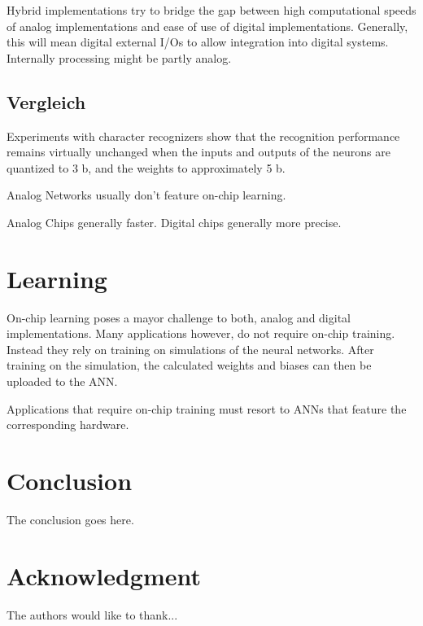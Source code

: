 \documentclass[conference]{IEEEtran}
\begin{document}
    Hybrid implementations try to bridge the gap between high computational speeds of analog implementations and ease of use of digital implementations.
    Generally, this will mean digital external I/Os to allow integration into digital systems.
    Internally processing might be partly analog.

    \subsection{Vergleich}
    Experiments with character recognizers show that the recognition performance remains virtually unchanged when the inputs and outputs of
    the neurons are quantized to 3 b, and the weights to approximately 5 b. \cite{boser1991analog}

    Analog Networks usually don't feature on-chip learning. \cite{ms1990digital}

    Analog Chips generally faster.
    Digital chips generally more precise.

    \section{Learning}

    On-chip learning poses a mayor challenge to both, analog and digital implementations.
    Many applications however, do not require on-chip training.
    Instead they rely on training on simulations of the neural networks.
    After training on the simulation, the calculated weights and biases can then be uploaded to the ANN\@.

    Applications that require on-chip training must resort to ANNs that feature the corresponding hardware.

    \section{Conclusion}
    The conclusion goes here.







    \section*{Acknowledgment}


    The authors would like to thank...
\end{document}
